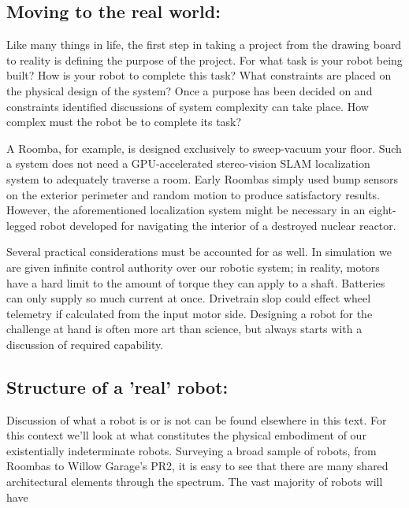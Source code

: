 \hypertarget{moving-to-the-real-world}{%
\subsection{Moving to the real world:}\label{moving-to-the-real-world}}

Like many things in life, the first step in taking a project from the
drawing board to reality is defining the purpose of the project. For
what task is your robot being built? How is your robot to complete this
task? What constraints are placed on the physical design of the system?
Once a purpose has been decided on and constraints identified
discussions of system complexity can take place. How complex must the
robot be to complete its task?

A Roomba, for example, is designed exclusively to sweep-vacuum your
floor. Such a system does not need a GPU-accelerated stereo-vision SLAM
localization system to adequately traverse a room. Early Roombas simply
used bump sensors on the exterior perimeter and random motion to produce
satisfactory results. However, the aforementioned localization system
might be necessary in an eight-legged robot developed for navigating the
interior of a destroyed nuclear reactor.

Several practical considerations must be accounted for as well. In
simulation we are given infinite control authority over our robotic
system; in reality, motors have a hard limit to the amount of torque
they can apply to a shaft. Batteries can only supply so much current at
once. Drivetrain slop could effect wheel telemetry if calculated from
the input motor side. Designing a robot for the challenge at hand is
often more art than science, but always starts with a discussion of
required capability.

\hypertarget{structure-of-a-real-robot}{%
\subsection{Structure of a 'real'
robot:}\label{structure-of-a-real-robot}}

Discussion of what a robot is or is not can be found elsewhere in this
text. For this context we'll look at what constitutes the physical
embodiment of our existentially indeterminate robots. Surveying a broad
sample of robots, from Roombas to Willow Garage's PR2, it is easy to see
that there are many shared architectural elements through the spectrum.
The vast majority of robots will have

